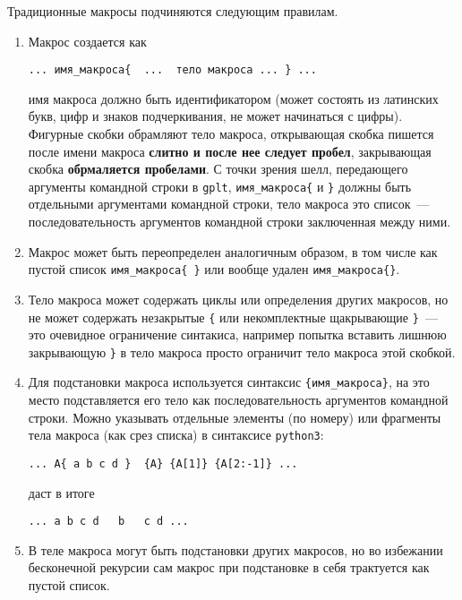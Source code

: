 \documentclass[12pt]{article}
\def\gplt{{\tt gplt}}
\def\python{{\tt python3}}
\begin{document}
Традиционные макросы подчиняются следующим правилам.
\begin{enumerate}
\item Макрос создается как
\begin{verbatim}
... имя_макроса{  ...  тело макроса ... } ...
\end{verbatim}
имя макроса должно быть идентификатором (может состоять из латинских букв, цифр и знаков подчеркивания, не может начинаться с цифры).
Фигурные скобки обрамляют тело макроса, открывающая скобка пишется после имени макроса {\bf слитно  и после нее следует пробел},
закрывающая скобка {\bf обрмаляется пробелами}. С точки зрения шелл, передающего аргументы командной строки в \gplt, \verb'имя_макроса{'
  и \verb'}' должны быть отдельными аргументами командной строки, тело макроса это список~--- последовательность аргументов командной строки заключенная между ними.
\item Макрос может быть переопределен аналогичным образом, в том числе как пустой список \verb'имя_макроса{ }' или вообще удален \verb'имя_макроса{}'.
\item Тело макроса может содержать циклы или определения других макросов, но не может содержать незакрытые \verb'{' или некомплектные щакрывающие \verb'}'~---
  это очевидное ограничение синтакиса, например попытка вставить лишнюю закрывающую \verb'}' в тело макроса просто ограничит тело макроса этой скобкой. 
\item Для подстановки макроса используется синтаксис \verb'{имя_макроса}', на это место подставляется его тело как последовательность аргументов командной строки.
Можно указывать отдельные элементы (по номеру) или фрагменты тела макроса (как срез списка) в синтаксисе \python:
\begin{verbatim}
... A{ a b c d }  {A} {A[1]} {A[2:-1]} ...
\end{verbatim}
даст в итоге
\begin{verbatim}
... a b c d   b   c d ...
\end{verbatim}
\item В теле макроса могут быть подстановки других макросов, но во избежании бесконечной рекурсии сам макрос при подстановке в себя трактуется как пустой список.
\end{enumerate}
\end{document}

